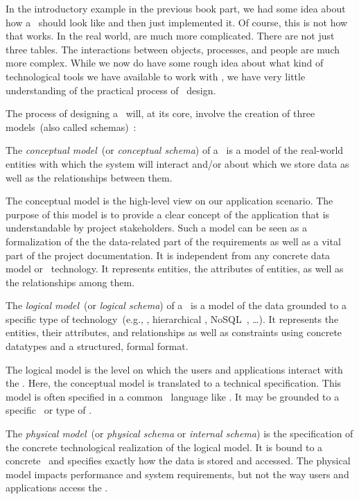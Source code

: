 %
%
In the introductory example in the previous book part, we had some idea about how a \db\ should look like and then just implemented it.
Of course, this is not how that works.
In the real world,  are much more complicated.
There are not just three tables.
The interactions between objects, processes, and people are much more complex.
While we now do have some rough idea about what kind of technological tools we have available to work with , we have very little understanding of the practical process of \db\ design.

The process of designing a \db\ will, at its core, involve the creation of three models~(also called schemas)~\cite{EN2015FODS}:%
%
\begin{definition}%
The \emph{conceptual model}~(or \emph{conceptual schema}) of a \db\ is a model of the real-world entities with which the system will interact and/or about which we store data as well as the relationships between them.%
\end{definition}%
%
The conceptual model is the high-level view on our application scenario.
The purpose of this model is to provide a clear concept of the application that is understandable by project stakeholders.
Such a model can be seen as a formalization of the the data-related part of the requirements as well as a vital part of the project documentation.
It is independent from any concrete data model or \db\ technology.
It represents entities, the attributes of entities, as well as the relationships among them.
%
\begin{definition}%
\label{def:logicalModel}%
The \emph{logical model}~(or \emph{logical schema}) of a \db\ is a model of the data grounded to a specific type of technology~(e.g., , hierarchical \db, NoSQL~\db, \dots). %
It represents the entities, their attributes, and relationships as well as constraints using concrete datatypes and a structured, formal format.%
\end{definition}%
%
The logical model is the level on which the users and applications interact with the \db.
Here, the conceptual model is translated to a technical specification.
This model is often specified in a common \db\ language like \sql.
It may be grounded to a specific \dbms\ or type of \dbms.%
%
\begin{definition}%
The \emph{physical model}~(or \emph{physical schema} or \emph{internal schema}) is the specification of the concrete technological realization of the logical model. %
It is bound to a concrete \dbms\ and specifies exactly how the data is stored and accessed. %
The physical model impacts performance and system requirements, but not the way users and applications access the \db.%
\end{definition}%
